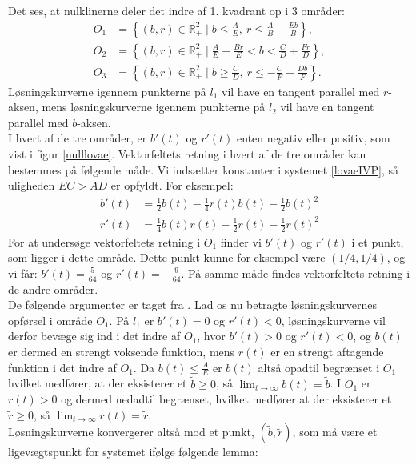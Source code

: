  Det ses, at nulklinerne deler det indre af 1. kvadrant op i 3 områder:
\begin{align*}
    O_1 &= \left\{(b,r) \in \mathbb{R}_+^2 \mid b \leq \frac{A}{E} , \ r \leq \frac{A}{B} - \frac{Eb}{B} \right\},\\
    O_2 &= \left\{(b,r) \in \mathbb{R}_+^2 \mid \frac{A}{E} - \frac{Br}{E} < b < \frac{C}{D} + \frac{Fr}{D} \right\},\\
    O_3 &= \left\{(b,r) \in \mathbb{R}_+^2 \mid b \geq \frac{C}{D} , \ r \leq -\frac{C}{F} + \frac{Db}{F}\right\}.
\end{align*}
Løsningskurverne igennem punkterne på $l_1$ vil have en tangent parallel med $r$-aksen, mens løsningskurverne igennem punkterne på $l_2$ vil have en tangent parallel med $b$-aksen.\\
I hvert af de tre områder, er $b'(t)$ og $r'(t)$ enten negativ eller positiv, som vist i figur \ref{nulllovae}. Vektorfeltets retning i hvert af de tre områder kan bestemmes på følgende måde. Vi indsætter konstanter i systemet \ref{lovaeIVP}, så uligheden $EC>AD$ er opfyldt. For eksempel:
\begin{equation*}
\begin{aligned}
    b'(t) &=\frac{1}{2}b(t)-\frac{1}{4}r(t)b(t)-\frac{1}{2}b(t)^2\\
    r'(t) &=\frac{1}{4}b(t)r(t)-\frac{1}{2}r(t)-\frac{1}{2}r(t)^2
\end{aligned}   
\end{equation*}
For at undersøge vektorfeltets retning i $O_1$ finder vi $b'(t)$ og $r'(t)$ i et punkt, som ligger i dette område. Dette punkt kunne for eksempel være $(1/4,1/4)$, og vi får: $b'(t)=\frac{5}{64}$ og $r'(t)=-\frac{9}{64}$. På samme måde findes vektorfeltets retning i de andre områder.\\ 
\hfill \break
De følgende argumenter er taget fra \citep[s. 258-259]{Svensk}. Lad os nu betragte løsningskurvernes opførsel i område $O_1$. På $l_1$ er $b'(t)=0$ og $r'(t)<0$, løsningskurverne vil derfor bevæge sig ind i det indre af $O_1$, hvor $b'(t)>0$ og $r'(t)<0$, og $b(t)$ er dermed en strengt voksende funktion, mens $r(t)$ er en strengt aftagende funktion i det indre af $O_1$. Da $b(t) \leq \frac{A}{E}$ er $b(t)$ altså opadtil begrænset i $O_1$ hvilket medfører, at der eksisterer et $\tilde{b} \geq 0$, så $\lim_{t \to \infty}b(t)=\tilde{b}$. I $O_1$ er $r(t)> 0$ og dermed nedadtil begrænset, hvilket medfører at der eksisterer et $\tilde{r} \geq 0$, så $\lim_{t \to \infty} r(t) = \tilde{r}$. 
\\  Løsningskurverne konvergerer altså mod et punkt, $(\tilde{b},\tilde{r})$, som må være et ligevægtspunkt for systemet ifølge følgende lemma:\\
